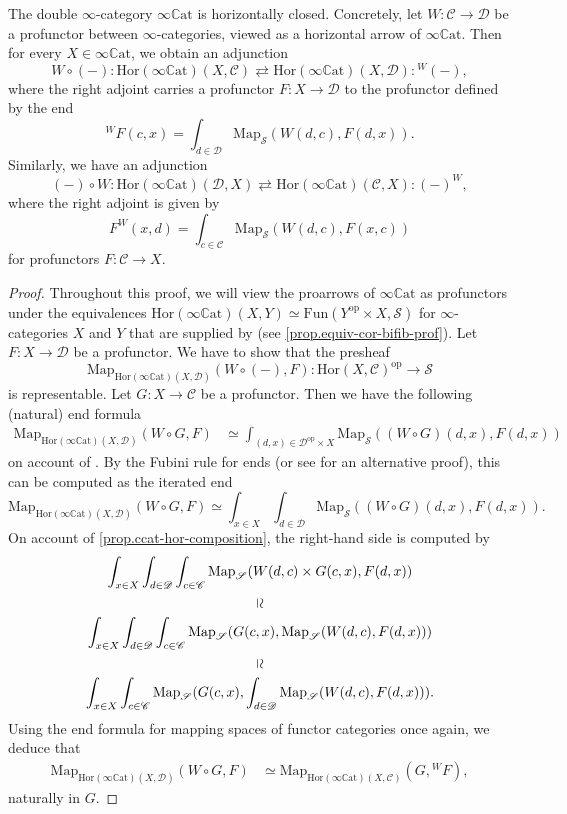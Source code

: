 \documentclass[a4paper, 11pt]{amsart}
\numberwithin{theorem}{section}
\theoremstyle{definition}
\newcommand{\op}{\mathrm{op}}
\newcommand{\map}{\mathrm{Map}}
\newcommand{\fun}{\mathrm{Fun}}
\renewcommand{\S}{\mathscr{S}}
\newcommand{\C}{\mathscr{C}}
\renewcommand{\D}{\mathscr{D}}
\newcommand{\Hor}{\mathrm{Hor}}
\newcommand{\CCAT}{\mathbb{C}\mathrm{at}}
\begin{document}
\begin{corollary}\label{cor.ccat-hor-closed}
	The double $\infty$-category $\infty\CCAT$ is horizontally closed. Concretely, let $W : \C \rightarrow \D$ be a profunctor 
	between $\infty$-categories, viewed as a horizontal arrow of $\infty\CCAT$. Then for every $X \in \infty\CCAT$, we obtain an adjunction
	\[
		W \circ (-) :  \Hor(\infty\CCAT)(X,\C) \rightleftarrows \Hor(\infty\CCAT)(X,\D)  : {}^W{(-)},
	\]
	where the right adjoint carries a profunctor $F :  X \rightarrow \D$ to the profunctor defined by the end
	$$
	{}^W{F}{}(c,x) = \int_{d \in \D} \map_\S(W(d,c), F(d,x)).
	$$
	Similarly, we have an adjunction 
	\[
		(-) \circ W : \Hor(\infty\CCAT)(\D,X) \rightleftarrows \Hor(\infty\CCAT)(\C,X) : (-)^W,
	\]
	where the right adjoint is given by 
	$$
	F^W(x,d) = \int_{c \in \C} \map_\S(W(d,c),F(x,c))
	$$
	for profunctors $F : \C \rightarrow X$.
\end{corollary}
\begin{proof}
	Throughout this proof, we will view the proarrows of $\infty\CCAT$ as profunctors under the equivalences 
	$\Hor(\infty\CCAT)(X,Y) \simeq \fun(Y^\op \times X, \S)
	$
	for $\infty$-categories $X$ and $Y$
	that are supplied by (see \cref{prop.equiv-cor-bifib-prof}).
	Let  $F : X \rightarrow \D$ be a profunctor. We have to show that the presheaf 
	$$
	\map_{\Hor(\infty\CCAT)(X,\D)}(W \circ (-), F) : \Hor(X,\C)^\op \rightarrow \S
	$$ 
	is representable. Let $G : X \rightarrow \C$ be a profunctor. Then we have the following (natural) end formula 
	\begin{align*}
	\map_{\Hor(\infty\CCAT)(X,\D)}(W \circ G, F) & \simeq \int_{(d,x) \in \D^\op \times X} \map_\S((W\circ G)(d,x), F(d,x))
	\end{align*}
	on account of \cite[Proposition 5.1]{GepnerHaugsengNikolaus}. By the Fubini rule for ends \cite[Theorem 2.2]{Loregian} (or see \cite{HaugsengEnds} for an alternative proof),
	this can be computed as the iterated end
	$$
	\map_{\Hor(\infty\CCAT)(X,\D)}(W \circ G, F) \simeq \int_{x \in X}\int_{d \in \D} \map_\S((W\circ G)(d,x), F(d,x)).
	$$
	On account of \cref{prop.ccat-hor-composition}, the right-hand side is computed by 
	\begin{gather*}
	 \int_{x \in X}\int_{d \in \D}\int_{c \in \C}\map_\S(W(d,c) \times G(c,x), F(d,x)) \\\mathrel{\rotatebox[origin=c]{-90}{$\simeq$}}  \\
	 \int_{x \in X}\int_{d \in \D}\int_{c \in \C}\map_\S(G(c,x), \map_\S(W(d,c), F(d,x))) \\\mathrel{\rotatebox[origin=c]{-90}{$\simeq$}} \\
	 \int_{x \in X}\int_{c \in \C}\map_\S(G(c,x), \int_{d \in \D} \map_\S(W(d,c), F(d,x))).
	\end{gather*}
	Using the end formula for mapping spaces of functor categories once again, we deduce that 
	\begin{align*}
		\map_{\Hor(\infty\CCAT)(X,\D)}(W \circ G, F) &\simeq \map_{\Hor(\infty\CCAT)(X,\C)}(G, {}^{W}F),
	\end{align*}
	naturally in $G$.
\end{proof}
\end{document}
